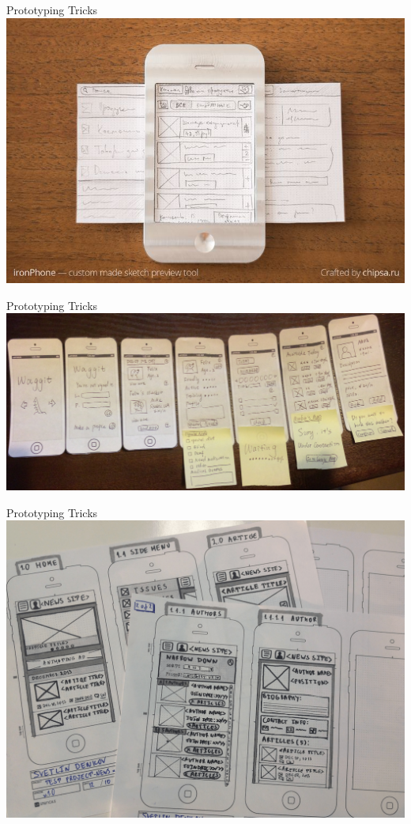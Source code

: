 \documentclass[10pt]{beamer}
\begin{document}
\begin{frame}{Prototyping Tricks}
\centering
	\includegraphics[width=\linewidth]{img/prototypingswipe.jpg}
\end{frame}

\begin{frame}{Prototyping Tricks}
\centering
	\includegraphics[width=\linewidth]{img/prototypingflow.jpg}
\end{frame}

\begin{frame}{Prototyping Tricks}
\centering
	\includegraphics[width=\linewidth]{img/prototypingorganized.png}
\end{frame}
\end{document}
